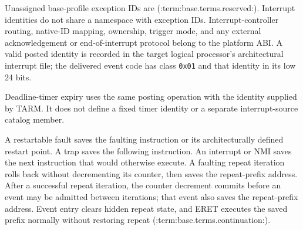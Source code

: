 Unassigned base-profile exception IDs are (:term:base.terms.reserved:). Interrupt identities do not share a namespace
with exception IDs. Interrupt-controller routing, native-ID mapping, ownership, trigger mode, and any external
acknowledgement or end-of-interrupt protocol belong to the platform ABI. A valid posted identity is recorded in the
target logical processor's architectural interrupt file; the delivered event code has class \texttt{0x01} and that
identity in its low 24 bits.

Deadline-timer expiry uses the same posting operation with the identity supplied by TARM. It does not define a
fixed timer identity or a separate interrupt-source catalog member.

A restartable fault saves the faulting instruction or its architecturally defined restart point. A trap saves the
following instruction. An interrupt or NMI saves the next instruction that would otherwise execute. A faulting repeat
iteration rolls back without decrementing its counter, then saves the repeat-prefix address. After a successful repeat
iteration, the counter decrement commits before an event may be admitted between iterations; that event also saves
the repeat-prefix address. Event entry clears hidden repeat state, and ERET executes the saved prefix normally without
restoring repeat (:term:base.terms.continuation:).
